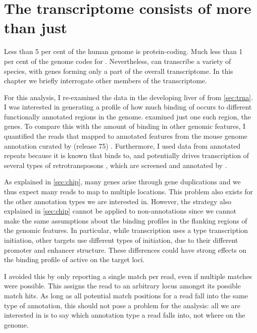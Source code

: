 \chapter{The  transcriptome consists of more than just }
\label{sec:pol3}

Less than \num{5} per cent of the human genome is protein-coding. Much less than
\num{1} per cent of the genome codes for \trna[s] \citep{Lander:2001}.
Nevertheless,  can transcribe a variety of \rna species, with \trna genes
forming only a part of the overall  transcriptome. In this chapter we
briefly interrogate other members of the  transcriptome.

For this analysis, I re-examined the \chipseq data in the developing liver of
\mmu from \cref{sec:trna}. I was interested in generating a profile of how much
binding of  occurs to different functionally annotated regions in the
genome.  examined just one such region, the \trna genes. To
compare this with the amount of binding in other genomic features, I quantified
the \chipseq reads that mapped to annotated features from the 
mouse genome annotation curated by  (release \num{75})
\citep{Flicek:2014}. Furthermore, I used data from annotated repeats because it
is known that  binds to, and potentially drives transcription of several
types of retrotransposons \citep{Carriere:2012}, which are screened and
annotated by  \citep{Smit:2014}.

As explained in \cref{sec:chip}, many \trna genes arise through gene
duplications and we thus expect many reads to map to multiple locations. This
problem also exists for the other annotation types we are interested in.
However, the strategy also explained in \cref{sec:chip} cannot be applied to
non-\trna annotations since we cannot make the same assumptions about the
binding profiles in the flanking regions of the genomic features. In particular,
while \trna transcription uses a type  transcription initiation,
other  targets use different types of initiation, due to their different
promoter and enhancer structure. These differences could have strong effects on
the binding profile of active  on the target loci.

I avoided this by only reporting a single match per read, even if multiple
matches were possible. This assigns the read to an arbitrary locus amongst its
possible match hits. As long as all potential match positions for a read fall
into the same type of annotation, this should not pose a problem for the
analysis: all we are interested in is to say which annotation type a read falls
into, not where on the genome.

